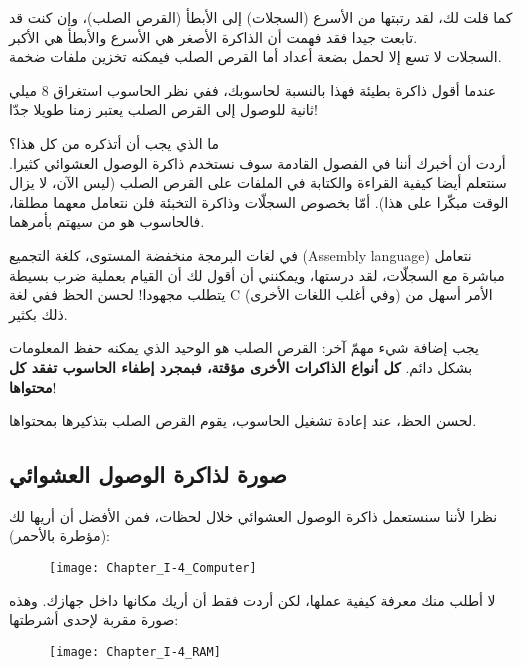 كما قلت لك، لقد رتبتها من الأسرع (السجلات) إلى الأبطأ (القرص الصلب)، وإن كنت قد تابعت جيدا فقد فهمت أن الذاكرة الأصغر هي الأسرع والأبطأ هي الأكبر.\\
السجلات لا تسع إلا لحمل بضعة أعداد أما القرص الصلب فيمكنه تخزين ملفات ضخمة.

\begin{information}
   عندما أقول ذاكرة بطيئة فهذا بالنسبة لحاسوبك، ففي نظر الحاسوب استغراق 8 ميلي ثانية للوصول إلى القرص الصلب يعتبر زمنا طويلا جدّا!
\end{information}

ما الذي يجب أن أتذكره من كل هذا؟\\
أردت أن أخبرك أننا في الفصول القادمة سوف نستخدم ذاكرة الوصول العشوائي كثيرا. سنتعلم أيضا كيفية القراءة والكتابة في الملفات على القرص الصلب (ليس الآن، لا يزال الوقت مبكّرا على هذا). أمّا بخصوص السجلّات وذاكرة التخبئة فلن نتعامل معهما مطلقا، فالحاسوب هو من سيهتم بأمرهما.

\begin{information}
  في لغات البرمجة منخفضة المستوى، كلغة التجميع
(\textenglish{Assembly language})
نتعامل مباشرة مع السجلّات، لقد درستها، ويمكنني أن أقول لك أن القيام بعملية ضرب بسيطة يتطلب مجهودا! لحسن الحظ ففي لغة
\textenglish{C}
 (وفي أغلب اللغات الأخرى) الأمر أسهل من ذلك بكثير.
\end{information}

يجب إضافة شيء مهمّ آخر: القرص الصلب هو الوحيد الذي يمكنه حفظ المعلومات بشكل دائم.
\textbf{كل أنواع الذاكرات الأخرى مؤقتة، فبمجرد إطفاء الحاسوب تفقد كل محتواها}!

لحسن الحظ، عند إعادة تشغيل الحاسوب، يقوم القرص الصلب بتذكيرها بمحتواها.

\subsection{صورة لذاكرة الوصول العشوائي}

نظرا لأننا سنستعمل ذاكرة الوصول العشوائي خلال لحظات، فمن الأفضل أن أريها لك (مؤطرة بالأحمر):

\begin{figure}[H]
	\centering
	\texttt{[image: Chapter\_I-4\_Computer]}
\end{figure}

لا أطلب منك معرفة كيفية عملها، لكن أردت فقط أن أريك مكانها داخل جهازك. وهذه صورة مقربة لإحدى أشرطتها:

\begin{figure}[H]
	\centering
	\texttt{[image: Chapter\_I-4\_RAM]}
\end{figure}


